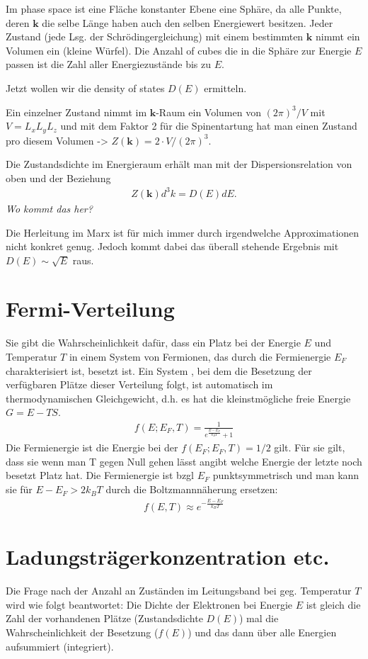 \documentclass[paper=a4,10pt]{scrartcl}
\begin{document}
Im phase space ist eine Fläche konstanter Ebene eine Sphäre, da alle Punkte, deren $\bm k$ die selbe Länge haben auch den selben Energiewert besitzen.
Jeder Zustand (jede Lsg. der Schrödingergleichung) mit einem bestimmten $\bm k$ nimmt ein Volumen ein (kleine Würfel).
Die Anzahl of cubes die in die Sphäre zur Energie $E$ passen ist die Zahl aller Energiezustände bis zu $E$.

Jetzt wollen wir die density of states $D(E)$ ermitteln.

Ein einzelner Zustand nimmt im $\bm k$-Raum ein Volumen von $(2\pi)^3/V$ mit $V=L_xL_yL_z$ und mit dem Faktor 2 für die Spinentartung hat man einen Zustand pro diesem Volumen -> $Z(\bm k) = 2 \cdot V/(2\pi)^3$. 

Die Zustandsdichte im Energieraum erhält man mit der Dispersionsrelation von oben und der Beziehung
\begin{align}
Z(\bm k) d^3k = D(E)dE.
\end{align} 
\textit{Wo kommt das her?}

Die Herleitung im Marx ist für mich immer durch irgendwelche Approximationen nicht konkret genug. Jedoch kommt dabei das überall stehende Ergebnis mit $D(E) \sim \sqrt{E}$ raus.

\section{Fermi-Verteilung}
Sie gibt die Wahrscheinlichkeit dafür, dass ein Platz bei der Energie $E$ und Temperatur $T$ in einem System von Fermionen, das durch die Fermienergie $E_F$ charakterisiert ist, besetzt ist.
Ein System , bei dem die Besetzung der verfügbaren Plätze dieser Verteilung folgt, ist automatisch im thermodynamischen Gleichgewicht, d.h. es hat die kleinstmögliche freie Energie $G = E-TS$.
\begin{align}
f(E;E_F, T) = \frac{1}{e^{\frac{E-E_F}{k_BT}}+1}
\end{align}
Die Fermienergie ist die Energie bei der $f(E_F; E_F, T) = 1/2$ gilt. Für sie gilt, dass sie wenn man T gegen Null gehen lässt angibt welche Energie der letzte noch besetzt Platz hat.
Die Fermienergie ist bzgl $E_F$ punktsymmetrisch und man kann sie für $E-E_F > 2k_BT$ durch die Boltzmannnäherung ersetzen:
\begin{align}
f(E,T) \approx e^{-\frac{E-E_F}{k_BT}}
\end{align}

\section{Ladungsträgerkonzentration etc.}
\label{seq:ladungskonz}
Die Frage nach der Anzahl an Zuständen im Leitungsband bei geg. Temperatur $T$ wird wie folgt beantwortet: Die Dichte der Elektronen bei Energie $E$ ist gleich die Zahl der vorhandenen Plätze (Zustandsdichte $D(E)$) mal die Wahrscheinlichkeit der Besetzung ($f(E)$) und das dann über alle Energien aufsummiert (integriert).
\end{document}
